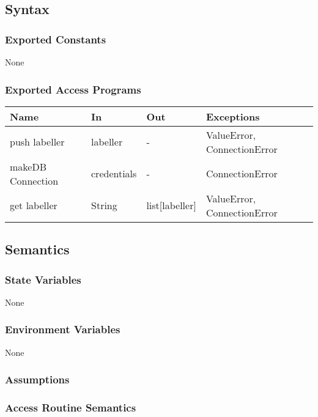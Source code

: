 \documentclass[12pt, titlepage]{article}
\begin{document}
  
  \subsection{Syntax}


  
  \subsubsection{Exported Constants}
  None
  \subsubsection{Exported Access Programs}
  
  \begin{center}
  \begin{tabular}{p{2cm} p{4cm} p{4cm} p{2cm}}
  \hline
  \textbf{Name} & \textbf{In} & \textbf{Out} & \textbf{Exceptions} \\
  \hline
  push labeller & labeller & - & ValueError, ConnectionError \\
  \hline
  makeDB Connection & credentials & - & ConnectionError \\
  \hline
  get labeller & String & list[labeller] & ValueError, ConnectionError \\
  \hline
  \end{tabular}
  \end{center}
  
  \subsection{Semantics}
  
  \subsubsection{State Variables}
  
  None
  
  \subsubsection{Environment Variables}
  
  None
  
  \subsubsection{Assumptions}
  
  
  \subsubsection{Access Routine Semantics}
  
\end{document}
